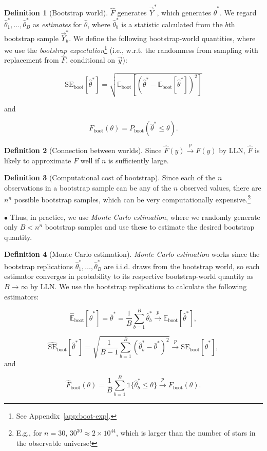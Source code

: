 \documentclass[12pt,oneside]{article}
\newcommand{\E}{\mathbb{E}}
\newcommand{\SE}{\text{SE}}
\newcommand{\boot}{\text{boot}}
\newcommand{\indic}{\mathds{1}}
\theoremstyle{definition}
\newtheorem{definition}{Definition}
\theoremstyle{remark}
\begin{document}
\begin{definition}[Bootstrap world]
$\hat{F}$ generates $\vec{Y}^*$, which generates $\hat{\theta}^*$. We regard $\hat{\theta}^*_1, \ldots, \hat{\theta}^*_B$ as \textit{estimates} for $\hat{\theta}$, where $\hat{\theta}^*_b$ is a statistic calculated from the $b$th bootstrap sample $\vec{Y}^*_b$. We define the following bootstrap-world quantities, where we use the \textit{bootstrap expectation}\footnote{See Appendix~\ref{app:boot-exp}.} (i.e., w.r.t. the randomness from sampling with replacement from $\hat{F}$, conditional on $\vec{y}$):

\[\SE_{\boot}[\hat{\theta}^*] = \sqrt{\E_{\boot}[(\hat{\theta}^* - \E_{\boot}[\hat{\theta}^*])^2]}\]

and

\[F_{\boot}(\theta) = P_{\boot}(\hat{\theta}^* \leq \theta).\]
\end{definition}

\begin{definition}[Connection between worlds]
Since $\hat{F}(y) \xrightarrow{p} F(y)$ by LLN, $\hat{F}$ is likely to approximate $F$ well if $n$ is sufficiently large.
\end{definition}

\begin{definition}[Computational cost of bootstrap]
Since each of the $n$ observations in a bootstrap sample can be any of the $n$ observed values, there are $n^n$ possible bootstrap samples, which can be very computationally expensive.\footnote{E.g., for $n = 30$, $30^{30} \approx 2 \times 10^{44}$, which is larger than the number of stars in the observable universe!} 

$\bullet$ Thus, in practice, we use \textit{Monte Carlo estimation}, where we randomly generate only $B < n^n$ bootstrap samples and use these to estimate the desired bootstrap quantity.
\end{definition}

\begin{definition}[Monte Carlo estimation]
\textit{Monte Carlo estimation} works since the bootstrap replications $\hat{\theta}^*_1, \ldots, \hat{\theta}^*_B$ are i.i.d. draws from the bootstrap world, so each estimator converges in probability to its respective bootstrap-world quantity as $B \rightarrow \infty$ by LLN. We use the bootstrap replications to calculate the following estimators:

\[\hat{\E}_{\boot}[\hat{\theta}^*] = \bar{\theta}^* = \frac{1}{B} \sum_{b = 1}^{B} \hat{\theta}^*_b \xrightarrow{p} \E_{\boot}[\hat{\theta}^*],\]

\[\widehat{\SE}_{\boot}[\hat{\theta}^*] = \sqrt{\frac{1}{B - 1} \sum_{b = 1}^{B} (\hat{\theta}^*_b - \bar{\theta}^*)^2} \xrightarrow{p} \SE_{\boot}[\hat{\theta}^*],\] and

\[\hat{F}_{\boot}(\theta) = \frac{1}{B} \sum_{b = 1}^{B} \indic\{\hat{\theta}^*_b \leq \theta\} \xrightarrow{p} F_{\boot}(\theta).\]
\end{definition}
\end{document}

